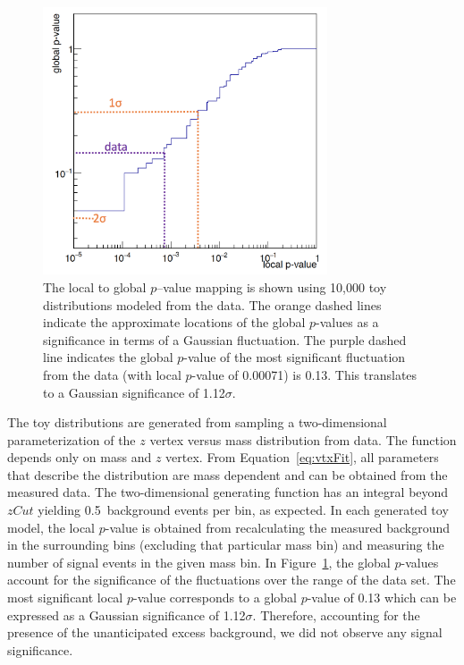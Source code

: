 \begin{figure}[htb]
  \centering
      \includegraphics[width=0.75\textwidth]{pics/results/pvalMap.png}
  \caption[Mapping of local to global $p$--values]{The local to global $p$--value mapping is shown using 10,000 toy distributions modeled from the data. The orange dashed lines indicate the approximate locations of the global $p$-values as a significance in terms of a Gaussian fluctuation. The purple dashed line indicates the global $p$-value of the most significant fluctuation from the data (with local $p$-value of 0.00071) is 0.13. This translates to a Gaussian significance of 1.12$\sigma$.}
  \label{fig:pval_map}
\end{figure} 
The toy distributions are generated from sampling a two-dimensional parameterization of the $z$ vertex versus mass distribution from data. The function depends only on mass and $z$ vertex. From Equation~\eqref{eq:vtxFit}, all parameters that describe the distribution are mass dependent and can be obtained from the measured data. The two-dimensional generating function has an integral beyond $zCut$ yielding 0.5~background events per bin, as expected. In each generated toy model, the local $p$-value is obtained from recalculating the measured background in the surrounding bins (excluding that particular mass bin) and measuring the number of signal events in the given mass bin. In Figure~\ref{fig:pval_map}, the global $p$-values account for the significance of the fluctuations over the range of the data set. The most significant local $p$-value corresponds to a global $p$-value of 0.13 which can be expressed as a Gaussian significance of 1.12$\sigma$. Therefore, accounting for the presence of the unanticipated excess background, we did not observe any signal significance. \\
